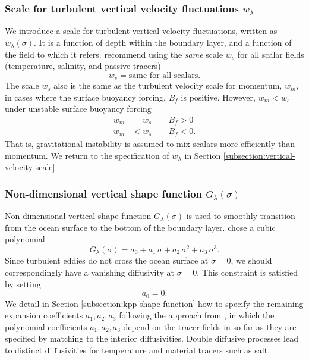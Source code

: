 \subsubsection{Scale for turbulent vertical velocity fluctuations $w_{\lambda}$}
\label{subsubsection:turbulent-vertical-velocity-scale}

We introduce a scale for turbulent vertical velocity fluctuations,
written as $w_{\lambda}(\sigma)$.  It is a function of depth within
the boundary layer, and a function of the field to which it refers.
\cite{LargeKPP} recommend using the {\it same} scale $w_{s}$ for all
scalar fields (temperature, salinity, and passive tracers)
\begin{equation}
  w_{s}= \mbox{same for all scalars}.
\end{equation}
The scale $w_{s}$ also is the same as the turbulent velocity scale for
momentum, $w_{m}$, in cases where the surface buoyancy forcing,
$B_{f}$ is positive.  However, $w_{m} < w_{s}$ under unstable surface
buoyancy forcing
\begin{subequations}
\begin{align}
  w_{m}  &= w_{s}  \qquad B_{f} > 0 \\
   w_{m} &< w_{s} \qquad B_{f} < 0.
\end{align}
\end{subequations}
That is, gravitational instability is assumed to mix scalars more
efficiently than momentum.  We return to the specification of
$w_{\lambda}$ in Section \ref{subsection:vertical-velocity-scale}.


\subsubsection{Non-dimensional vertical shape function $G_{\lambda}(\sigma)$}

Non-dimensional vertical shape function $G_{\lambda}(\sigma)$ is used to
smoothly transition from the ocean surface to the bottom of the
boundary layer. \cite{LargeKPP} chose a cubic polynomial
\begin{equation}
 G_{\lambda}(\sigma) = a_{0} + a_{1} \, \sigma + a_{2} \, \sigma^{2} + a_{3} \, \sigma^{3}.
\label{eq:shape-function-gsigma}
\end{equation}
Since turbulent eddies do not cross the ocean surface at $\sigma=0$,
we should correspondingly have a vanishing diffusivity at $\sigma=0$.
This constraint is satisfied by setting 
\begin{equation}
 a_{0} = 0.
\end{equation}
We detail in Section \ref{subsection:kpp-shape-function} how to
specify the remaining expansion coefficients $a_{1}, a_{2}, a_{3}$
following the approach from \cite{LargeKPP}, in which the polynomial
coefficients $a_{1}, a_{2}, a_{3}$ depend on the tracer fields in so
far as they are specified by matching to the interior diffusivities.
Double diffusive processes lead to distinct diffusivities for
temperature and material tracers such as salt.  

